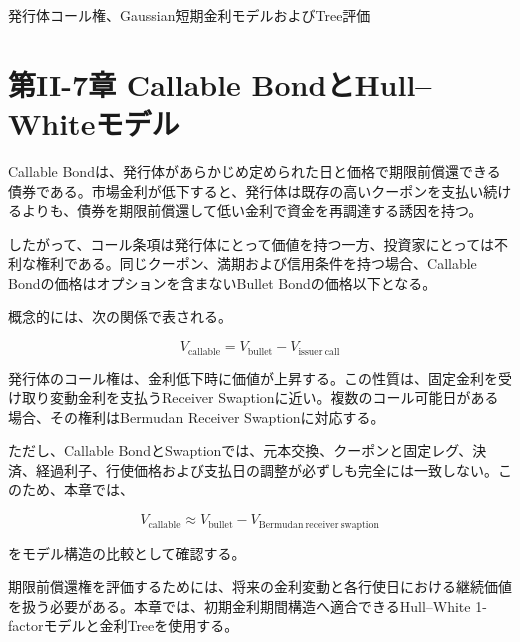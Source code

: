 \documentclass[
  letterpaper,
  DIV=11,
  numbers=noendperiod]{scrreprt}
\newenvironment{Shaded}{\begin{snugshade}}{\end{snugshade}}
\newcommand{\AttributeTok}[1]{\textcolor[rgb]{0.40,0.45,0.13}{#1}}
\newcommand{\ConstantTok}[1]{\textcolor[rgb]{0.56,0.35,0.01}{#1}}
\newcommand{\FunctionTok}[1]{\textcolor[rgb]{0.28,0.35,0.67}{#1}}
\newcommand{\NormalTok}[1]{\textcolor[rgb]{0.00,0.23,0.31}{#1}}
\newcommand{\SpecialCharTok}[1]{\textcolor[rgb]{0.37,0.37,0.37}{#1}}
\newcommand{\StringTok}[1]{\textcolor[rgb]{0.13,0.47,0.30}{#1}}
\begin{document}
発行体コール権、Gaussian短期金利モデルおよびTree評価

\hfill\break

\chapter{第II-7章 Callable
BondとHull--Whiteモデル}\label{ux7b2cii-7ux7ae0-callable-bondux3068hullwhiteux30e2ux30c7ux30eb-1}

Callable
Bondは、発行体があらかじめ定められた日と価格で期限前償還できる債券である。市場金利が低下すると、発行体は既存の高いクーポンを支払い続けるよりも、債券を期限前償還して低い金利で資金を再調達する誘因を持つ。

したがって、コール条項は発行体にとって価値を持つ一方、投資家にとっては不利な権利である。同じクーポン、満期および信用条件を持つ場合、Callable
Bondの価格はオプションを含まないBullet Bondの価格以下となる。

概念的には、次の関係で表される。

\[
V_{\mathrm{callable}}
=
V_{\mathrm{bullet}}
-
V_{\mathrm{issuer\ call}}
\]

発行体のコール権は、金利低下時に価値が上昇する。この性質は、固定金利を受け取り変動金利を支払うReceiver
Swaptionに近い。複数のコール可能日がある場合、その権利はBermudan
Receiver Swaptionに対応する。

ただし、Callable
BondとSwaptionでは、元本交換、クーポンと固定レグ、決済、経過利子、行使価格および支払日の調整が必ずしも完全には一致しない。このため、本章では、

\[
V_{\mathrm{callable}}
\approx
V_{\mathrm{bullet}}
-
V_{\mathrm{Bermudan\ receiver\ swaption}}
\]

をモデル構造の比較として確認する。

期限前償還権を評価するためには、将来の金利変動と各行使日における継続価値を扱う必要がある。本章では、初期金利期間構造へ適合できるHull--White
1-factorモデルと金利Treeを使用する。

\begin{Shaded}
\end{Shaded}
\end{document}
